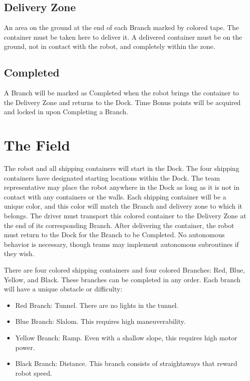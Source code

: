 \documentclass[a4paper,12pt]{article}
\begin{document}
\subsection{Delivery Zone}
An area on the ground at the end of each Branch marked by colored tape. The container must be taken here to deliver it. A delivered container must be on the ground, not in contact with the robot, and completely within the zone. 

\subsection{Completed}
A Branch will be marked as Completed when the robot brings the container to the Delivery Zone and returns to the Dock. Time Bonus points will be acquired and locked in upon Completing a Branch.

\section{The Field}
The robot and all shipping containers will start in the Dock. The four shipping containers have designated starting locations within the Dock. The team representative may place the robot anywhere in the Dock as long as it is not in contact with any containers or the walls. Each shipping container will be a unique color, and this color will match the Branch and delivery zone to which it belongs. The driver must transport this colored container to the Delivery Zone at the end of its corresponding Branch. After delivering the container, the robot must return to the Dock for the Branch to be Completed. No autonomous behavior is necessary, though teams may implement autonomous subroutines if they wish. \newline 

\noindent
There are four colored shipping containers and four colored Branches: Red, Blue, Yellow, and Black. These branches can be completed in any order. Each branch will have a unique obstacle or difficulty:  

\begin{itemize}
    \item Red Branch: Tunnel. There are no lights in the tunnel. 
    \item Blue Branch: Slalom. This requires high maneuverability. 
    \item Yellow Branch: Ramp. Even with a shallow slope, this requires high motor power. 
    \item Black Branch: Distance. This branch consists of straightaways that reward robot speed. 
\end{itemize}
\end{document}
